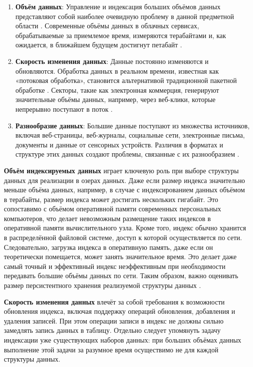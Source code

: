 \begin{enumerate}
    \item \textbf{Объём данных}: Управление и индексация больших объёмов данных представляют собой наиболее очевидную проблему в данной предметной области \cite{Big_data_challenge}. Современные объёмы данных в облачных сервисах, обрабатываемые за приемлемое время, измеряются терабайтами и, как ожидается, в ближайшем будущем достигнут петабайт \cite{Big_data_issues_challenges_tools}.
    \item \textbf{Скорость изменения данных}: Данные постоянно изменяются и обновляются. Обработка данных в реальном времени, известная как «потоковая обработка», становится альтернативой традиционной пакетной обработке \cite{Big_data_challenge}. Секторы, такие как электронная коммерция, генерируют значительные объёмы данных, например, через веб-клики, которые непрерывно поступают в поток \cite{Big_data_Issues_and_challenges}. 
    \item \textbf{Разнообразие данных}: Большие данные поступают из множества источников, включая веб-страницы, веб-журналы, социальные сети, электронные письма, документы и данные от сенсорных устройств. Различия в форматах и структуре этих данных создают проблемы, связанные с их разнообразием \cite{Addressing_big_data_variety}.
\end{enumerate}

\textbf{Объём индексируемых данных} играет ключевую роль при выборе структуры данных для реализации в озерах данных. Даже если размер индекса значительно меньше объёма данных, например, в случае с индексированием данных объёмом в терабайты, размер индекса может достигать нескольких гигабайт. Это сопоставимо с объёмом оперативной памяти современных персональных компьютеров, что делает невозможным размещение таких индексов в оперативной памяти вычислительного узла. Кроме того, индекс обычно хранится в распределённой файловой системе, доступ к которой осуществляется по сети. Следовательно, загрузка индекса в оперативную память, даже если он теоретически помещается, может занять значительное время. Это делает даже самый точный и эффективный индекс неэффективным при необходимости передавать большие объёмы данных по сети. Таким образом, важно оценивать размер персистентного хранения реализуемой структуры данных \cite{Big_data_issues_challenges_tools}.

\textbf{Скорость изменения данных} влечёт за собой требования к возможности обновления индекса, включая поддержку операций обновления, добавления и удаления записей. При этом операции записи в индекс не должны сильно замедлять запись данных в таблицу. Отдельно следует упомянуть задачу индексации уже существующих наборов данных: при больших объёмах данных выполнение этой задачи за разумное время осуществимо не для каждой структуры данных.

